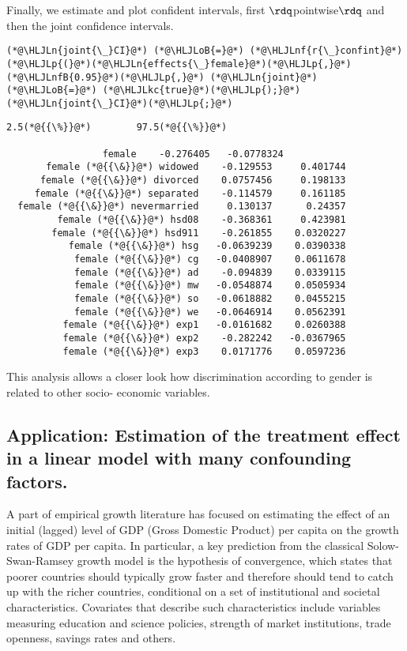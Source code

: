 \documentclass[12pt,a4paper]{article}
\newcommand{\HLJLkc}[1]{\textcolor[RGB]{59,151,46}{\textit{#1}}}
\newcommand{\HLJLn}[1]{#1}
\newcommand{\HLJLnf}[1]{\textcolor[RGB]{66,102,213}{#1}}
\newcommand{\HLJLnfB}[1]{\textcolor[RGB]{59,151,46}{#1}}
\newcommand{\HLJLoB}[1]{\textcolor[RGB]{102,102,102}{\textbf{#1}}}
\newcommand{\HLJLp}[1]{#1}
\begin{document}
Finally, we estimate and plot confident intervals, first \ensuremath{\rdq}pointwise\ensuremath{\rdq} and then the joint confidence intervals.


\begin{lstlisting}
(*@\HLJLn{joint{\_}CI}@*) (*@\HLJLoB{=}@*) (*@\HLJLnf{r{\_}confint}@*)(*@\HLJLp{(}@*)(*@\HLJLn{effects{\_}female}@*)(*@\HLJLp{,}@*) (*@\HLJLnfB{0.95}@*)(*@\HLJLp{,}@*) (*@\HLJLn{joint}@*) (*@\HLJLoB{=}@*) (*@\HLJLkc{true}@*)(*@\HLJLp{);}@*)
(*@\HLJLn{joint{\_}CI}@*)(*@\HLJLp{;}@*)
\end{lstlisting}

\begin{lstlisting}
2.5(*@{{\%}}@*)        97.5(*@{{\%}}@*)

                 female    -0.276405   -0.0778324
       female (*@{{\&}}@*) widowed    -0.129553     0.401744
      female (*@{{\&}}@*) divorced    0.0757456     0.198133
     female (*@{{\&}}@*) separated    -0.114579     0.161185
  female (*@{{\&}}@*) nevermarried     0.130137      0.24357
         female (*@{{\&}}@*) hsd08    -0.368361     0.423981
        female (*@{{\&}}@*) hsd911    -0.261855    0.0320227
           female (*@{{\&}}@*) hsg   -0.0639239    0.0390338
            female (*@{{\&}}@*) cg   -0.0408907    0.0611678
            female (*@{{\&}}@*) ad    -0.094839    0.0339115
            female (*@{{\&}}@*) mw   -0.0548874    0.0505934
            female (*@{{\&}}@*) so   -0.0618882    0.0455215
            female (*@{{\&}}@*) we   -0.0646914    0.0562391
          female (*@{{\&}}@*) exp1   -0.0161682    0.0260388
          female (*@{{\&}}@*) exp2    -0.282242   -0.0367965
          female (*@{{\&}}@*) exp3    0.0171776    0.0597236
\end{lstlisting}


This analysis allows a closer look how discrimination according to gender is related to other socio- economic variables.

\subsection{Application: Estimation of the treatment effect in a linear model with many confounding factors.}
A part of empirical growth literature has focused on estimating the effect of an initial (lagged) level of GDP (Gross Domestic Product) per capita on the growth rates of GDP per capita. In particular, a key prediction from the classical Solow-Swan-Ramsey growth model is the hypothesis of convergence, which states that poorer countries should typically grow faster and therefore should tend to catch up with the richer countries, conditional on a set of institutional and societal characteristics. Covariates that describe such characteristics include variables measuring education and science policies, strength of market institutions, trade openness, savings rates and others.
\end{document}
